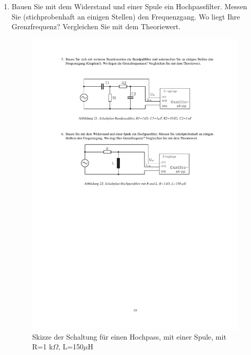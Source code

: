 \documentclass[12pt]{scrartcl}
\begin{document}
\begin{enumerate}
\begin{figure}[htbp]
  \label{fig:Bandpass}
\end{figure}
\newpage
{}
\item
Bauen Sie mit dem Widerstand und einer Spule ein Hochpassfilter. Messen Sie (stichprobenhaft an einigen Stellen) den Frequenzgang. Wo liegt Ihre Grenzfrequenz? Vergleichen Sie mit dem Theoriewert.
\begin{figure}[htbp] 
  \centering
    \includegraphics[trim = 20mm 155mm 1mm 105mm, clip, scale = 1]{bandpass_hochpass.pdf}
  	\caption[Skizze der Schaltung für einen Hochpass, mit einer Spule, mit R=1 k$\Omega$, L=150$\mu$H]{Skizze der Schaltung für einen Hochpass, mit einer Spule, mit R=1 k$\Omega$, L=150$\mu$H\footnotemark}
  \label{fig:Hochpass_spule}
\end{figure}

\end{enumerate}
\end{document}
